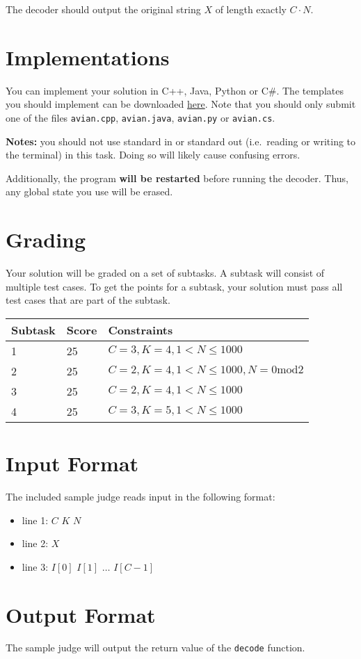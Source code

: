 The decoder should output the original string $X$ of length exactly $C \cdot N$.

\section*{Implementations}
You can implement your solution in C++, Java, Python or C\#.
The templates you should implement can be downloaded \href{http://progolymp.se/uploads/avian.zip}{here}.
Note that you should only submit one of the files \texttt{avian.cpp}, \texttt{avian.java}, \texttt{avian.py} or \texttt{avian.cs}.

\textbf{Notes:} you should not use standard in or standard out (i.e.\ reading or writing to the terminal) in this task.
Doing so will likely cause confusing errors.

Additionally, the program \textbf{will be restarted} before running the decoder.
Thus, any global state you use will be erased.

\section*{Grading}
Your solution will be graded on a set of subtasks.
A subtask will consist of multiple test cases.
To get the points for a subtask, your solution must pass all test cases that are part of the subtask.

\noindent
\begin{tabular}{| l | l | l |}
\hline
Subtask & Score & Constraints \\ \hline
1       & 25    & $C = 3, K = 4, 1 < N \le 1000$ \\ \hline
2       & 25    & $C = 2, K = 4, 1 < N \le 1000, N=0 \text{mod} 2$ \\ \hline
3       & 25    & $C = 2, K = 4, 1 < N \le 1000$ \\ \hline
4       & 25    & $C = 3, K = 5, 1 < N \le 1000$ \\ \hline
\end{tabular}

\section*{Input Format}
The included sample judge reads input in the following format:
\begin{itemize}
	\item line 1: $C$ $K$ $N$
	\item line 2: $X$
	\item line 3: $I[0]$ $I[1]$ $\ldots$ $I[C - 1]$
\end{itemize}

\section*{Output Format}
The sample judge will output the return value of the \texttt{decode} function.
